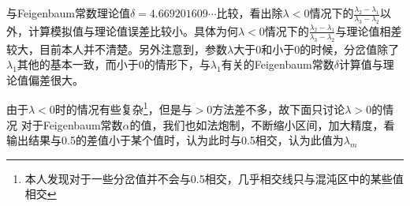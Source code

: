 \documentclass[a4paper,11pt]{article}
\begin{document}
\begin{table}[!htbp]
\centering
{}
\caption{$\lambda > 0$时的Feigenbaum常数$\delta$计算结果}
\end{table}

\newpage
与Feigenbaum常数理论值$\delta = 4.669201609 \cdots$比较，看出除$\lambda < 0 $情况下的$\frac{\lambda_{2}-\lambda_{1}}{\lambda_{3}-\lambda_{2}}$以外，计算模拟值与理论值误差比较小。具体为何$\lambda < 0 $情况下的$\frac{\lambda_{2}-\lambda_{1}}{\lambda_{3}-\lambda_{2}}$与理论值相差较大，目前本人并不清楚。另外注意到，参数$\lambda$大于0和小于0的时候，分岔值除了$\lambda_{1}$其他的基本一致，而小于0的情形下，与$\lambda_{1}$有关的Feigenbaum常数$\delta$计算值与理论值偏差很大。

由于$\lambda<0$时的情况有些复杂\footnote{本人发现对于一些分岔值并不会与0.5相交，几乎相交线只与混沌区中的某些值相交}，但是与$>0$方法差不多，故下面只讨论$\lambda>0$的情况
对于Feigenbaum常数$\alpha$的值，我们也如法炮制，不断缩小区间，加大精度，看输出结果与0.5的差值小于某个值时，认为此时与0.5相交，认为此值为$\lambda_{m}$

\end{document}
